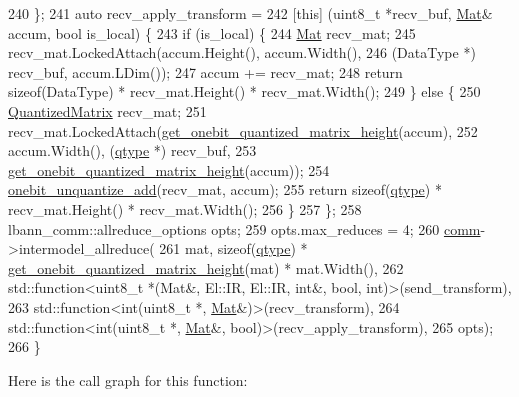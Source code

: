 \begin{DoxyCode}
240   \};
241   \textcolor{keyword}{auto} recv\_apply\_transform =
242   [\textcolor{keyword}{this}] (uint8\_t *recv\_buf, \hyperlink{base_8hpp_a68f11fdc31b62516cb310831bbe54d73}{Mat}& accum, \textcolor{keywordtype}{bool} is\_local) \{
243     \textcolor{keywordflow}{if} (is\_local) \{
244       \hyperlink{base_8hpp_a68f11fdc31b62516cb310831bbe54d73}{Mat} recv\_mat;
245       recv\_mat.LockedAttach(accum.Height(), accum.Width(),
246                             (DataType *) recv\_buf, accum.LDim());
247       accum += recv\_mat;
248       \textcolor{keywordflow}{return} \textcolor{keyword}{sizeof}(DataType) * recv\_mat.Height() * recv\_mat.Width();
249     \} \textcolor{keywordflow}{else} \{
250       \hyperlink{classlbann_1_1lbann__quantizer_a399f3f8c393b6021b43e95d1ce6ea28c}{QuantizedMatrix} recv\_mat;
251       recv\_mat.LockedAttach(\hyperlink{classlbann_1_1lbann__quantizer_aa1541b9afa60250dbd570acbbe98242f}{get\_onebit\_quantized\_matrix\_height}(accum),
252                             accum.Width(), (\hyperlink{classlbann_1_1lbann__quantizer_afcda642ff1b44d31eec910909c3d013e}{qtype} *) recv\_buf,
253                             \hyperlink{classlbann_1_1lbann__quantizer_aa1541b9afa60250dbd570acbbe98242f}{get\_onebit\_quantized\_matrix\_height}(accum));
254       \hyperlink{classlbann_1_1lbann__quantizer_a879cea8464408b8265be9e55edd83b2c}{onebit\_unquantize\_add}(recv\_mat, accum);
255       \textcolor{keywordflow}{return} \textcolor{keyword}{sizeof}(\hyperlink{classlbann_1_1lbann__quantizer_afcda642ff1b44d31eec910909c3d013e}{qtype}) * recv\_mat.Height() * recv\_mat.Width();
256     \}
257   \};
258   lbann\_comm::allreduce\_options opts;
259   opts.max\_reduces = 4;
260   \hyperlink{file__io_8cpp_ab048c6f9fcbcfaa57ce68b00263dbebe}{comm}->intermodel\_allreduce(
261     mat, \textcolor{keyword}{sizeof}(\hyperlink{classlbann_1_1lbann__quantizer_afcda642ff1b44d31eec910909c3d013e}{qtype}) * \hyperlink{classlbann_1_1lbann__quantizer_aa1541b9afa60250dbd570acbbe98242f}{get\_onebit\_quantized\_matrix\_height}(mat) * 
      mat.Width(),
262     std::function<uint8\_t *(Mat&, El::IR, El::IR, int&, bool, int)>(send\_transform),
263     std::function<\textcolor{keywordtype}{int}(uint8\_t *, \hyperlink{base_8hpp_a68f11fdc31b62516cb310831bbe54d73}{Mat}&)>(recv\_transform),
264     std::function<\textcolor{keywordtype}{int}(uint8\_t *, \hyperlink{base_8hpp_a68f11fdc31b62516cb310831bbe54d73}{Mat}&, \textcolor{keywordtype}{bool})>(recv\_apply\_transform),
265     opts);
266 \}
\end{DoxyCode}
Here is the call graph for this function\+:\nopagebreak
